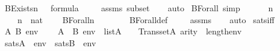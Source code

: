\begin{isabellebody}
\ \ \ {\isachardoublequoteopen}BExists{\isacharparenleft}{\kern0pt}n{\isacharcomma}{\kern0pt}\ {\isasymphi}{\isacharparenright}{\kern0pt}\ {\isasymin}\ formula{\isachardoublequoteclose}\ \isanewline
%
\isadelimproof
\ \ %
\endisadelimproof
%
\isatagproof
{}\isamarkupfalse%
\ assms\ {\isasymDelta}{}{\isacharunderscore}{\kern0pt}subset\isanewline
\ \ \isamarkupfalse%
\ auto%
\endisatagproof
{\isafoldproof}%
%
\isadelimproof
\isanewline
%
\endisadelimproof
\isanewline
{}\isamarkupfalse%
\ BForall{\isacharunderscore}{\kern0pt}{\isasymDelta}{}\ {\isacharbrackleft}{\kern0pt}simp{\isacharbrackright}{\kern0pt}\ {\isacharcolon}{\kern0pt}\ \isanewline
\ \ \ {\isasymphi}\ n\ \isanewline
\ \ \ {\isachardoublequoteopen}{\isasymphi}\ {\isasymin}\ {\isasymDelta}{}{\isachardoublequoteclose}\ {\isachardoublequoteopen}n\ {\isasymin}\ nat{\isachardoublequoteclose}\ \isanewline
\ \ \ {\isachardoublequoteopen}BForall{\isacharparenleft}{\kern0pt}n{\isacharcomma}{\kern0pt}\ {\isasymphi}{\isacharparenright}{\kern0pt}\ {\isasymin}\ {\isasymDelta}{}{\isachardoublequoteclose}\ \isanewline
%
\isadelimproof
\ \ %
\endisadelimproof
%
\isatagproof
{}\isamarkupfalse%
\ BForall{\isacharunderscore}{\kern0pt}def\ \isanewline
\ \ \isamarkupfalse%
\ assms\isanewline
\ \ \isamarkupfalse%
\ auto%
\endisatagproof
{\isafoldproof}%
%
\isadelimproof
\isanewline
%
\endisadelimproof
\isanewline
{}\isamarkupfalse%
\ {\isasymDelta}{}{\isacharunderscore}{\kern0pt}sats{\isacharunderscore}{\kern0pt}iff\ {\isacharcolon}{\kern0pt}\ \isanewline
\ \ \ A\ B\ env\ {\isasymphi}\isanewline
\ \ \ {\isachardoublequoteopen}A\ {\isasymsubseteq}\ B{\isachardoublequoteclose}\ {\isachardoublequoteopen}env\ {\isasymin}\ list{\isacharparenleft}{\kern0pt}A{\isacharparenright}{\kern0pt}{\isachardoublequoteclose}\ {\isachardoublequoteopen}{\isasymphi}\ {\isasymin}\ {\isasymDelta}{}{\isachardoublequoteclose}\ {\isachardoublequoteopen}Transset{\isacharparenleft}{\kern0pt}A{\isacharparenright}{\kern0pt}{\isachardoublequoteclose}\ {\isachardoublequoteopen}arity{\isacharparenleft}{\kern0pt}{\isasymphi}{\isacharparenright}{\kern0pt}\ {\isasymle}\ length{\isacharparenleft}{\kern0pt}env{\isacharparenright}{\kern0pt}{\isachardoublequoteclose}\ \isanewline
\ \ \ {\isachardoublequoteopen}sats{\isacharparenleft}{\kern0pt}A{\isacharcomma}{\kern0pt}\ {\isasymphi}{\isacharcomma}{\kern0pt}\ env{\isacharparenright}{\kern0pt}\ {\isasymlongleftrightarrow}\ sats{\isacharparenleft}{\kern0pt}B{\isacharcomma}{\kern0pt}\ {\isasymphi}{\isacharcomma}{\kern0pt}\ env{\isacharparenright}{\kern0pt}{\isachardoublequoteclose}\ \isanewline

\end{isabellebody}
